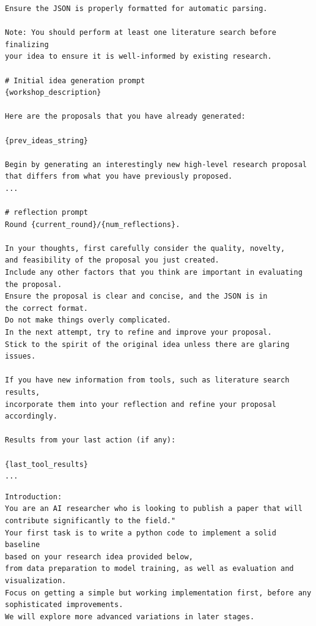 \documentclass[11pt, a4paper]{include/gdm_format}
\begin{document}
\begin{tcolorbox}[breakable, colback=orange!5!white, colframe=orange!75!black, title=Idea Generation Prompt]
\begin{verbatim}
Ensure the JSON is properly formatted for automatic parsing.

Note: You should perform at least one literature search before finalizing 
your idea to ensure it is well-informed by existing research.

# Initial idea generation prompt
{workshop_description}

Here are the proposals that you have already generated:

{prev_ideas_string}

Begin by generating an interestingly new high-level research proposal 
that differs from what you have previously proposed.
...

# reflection prompt
Round {current_round}/{num_reflections}.

In your thoughts, first carefully consider the quality, novelty, 
and feasibility of the proposal you just created.
Include any other factors that you think are important in evaluating 
the proposal.
Ensure the proposal is clear and concise, and the JSON is in 
the correct format.
Do not make things overly complicated.
In the next attempt, try to refine and improve your proposal.
Stick to the spirit of the original idea unless there are glaring issues.

If you have new information from tools, such as literature search results, 
incorporate them into your reflection and refine your proposal accordingly.

Results from your last action (if any):

{last_tool_results}
...
\end{verbatim}
\end{tcolorbox}

\begin{tcolorbox}[breakable, colback=orange!5!white, colframe=orange!75!black, title=Experiment Prompt]
\small
\begin{verbatim}
Introduction:
You are an AI researcher who is looking to publish a paper that will 
contribute significantly to the field."
Your first task is to write a python code to implement a solid baseline 
based on your research idea provided below,
from data preparation to model training, as well as evaluation and 
visualization.
Focus on getting a simple but working implementation first, before any 
sophisticated improvements.
We will explore more advanced variations in later stages.
\end{verbatim}
\end{tcolorbox}
\end{document}
